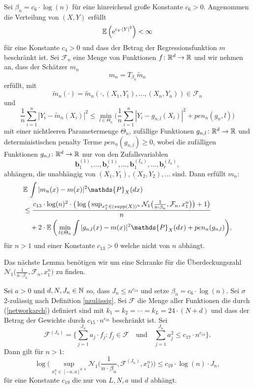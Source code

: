   \begin{lem}
  \label{lem:8}
Sei $\beta_n = c_6 \cdot \log(n)$ für eine hinreichend große Konstante $c_6 > 0$. Angenommen die Verteilung von $(X, Y)$ erfüllt 
$$ \mathbb{E}\,\Big(\mathrm{e}^{c_4 \cdot |Y|^2}\Big) < \infty$$
für eine Konstante $c_4 > 0$ und dass der Betrag der Regressionsfunktion $m$ beschränkt ist. Sei $\mathcal{F}_n$ eine Menge von Funktionen $f\colon \mathbb{R}^d \to \mathbb{R}$ und wir nehmen an, dass der Schätzer $m_n$ 
$$m_n = T_{\beta_n}\tilde{m}_n$$ 
erfüllt, mit 
$$\tilde{m}_n(\cdot) = \tilde{m}_n(\cdot,(X_1, Y_1),\dots,(X_n, Y_n)) \in \mathcal{F}_n$$
und 
$$\frac{1}{n} \sum_{i = 1}^n |Y_i - \tilde{m}_n(X_i)|^2 \leq \min_{l \in \Theta_n}\bigg(\frac{1}{n}\sum_{i = 1}^n |Y_i - g_{n,l}(X_i)|^2 + pen_n(g_n,l)\bigg)$$
mit einer nichtleeren Parametermenge $\Theta_n$, zufällige Funktionen $g_{n,l}\colon \mathbb{R}^d \to \mathbb{R}$ und deterministischen penalty Terme $pen_n(g_{n,l}) \geq 0$, wobei die zufälligen Funktionen $g_{n,l}\colon \mathbb{R}^d \to \mathbb{R}$ nur von den Zufallsvariablen
$$\mathbf{b}_1^{(1)},\dots,\mathbf{b}_r^{(1)},\dots,\mathbf{b}_1^{(I_n)},\dots,\mathbf{b}_r^{(I_n)},$$
abhängen, die unabhängig von $(X_1, Y_1), (X_2, Y_2),\dots$ sind.
Dann erfüllt $m_n\colon$
\begin{equation*}
\begin{split}
& \E \int |m_n(x) - m(x)|^2 \mathds{P}_X(dx) \\
& \leq \frac{c_{13} \cdot \log(n)^2 \cdot \big(\log\big(\sup_{x_1^n \in (supp(X))^n}\mathcal{N}_1\big(\frac{1}{n \cdot \beta_n},\mathcal{F}_n,x_1^n\big)\big) + 1\big)}{n} \\
& \quad + 2 \cdot \E\bigg(\min_{l \in \Theta_n} \int |g_{n,l}(x) - m(x)|^2 \mathds{P}_X(dx) + pen_n(g_{n,l})\bigg),
\end{split}
\end{equation*}
für $n > 1$ und einer Konstante $c_{13} > 0$ welche nicht von $n$ abhängt.
  \end{lem}
Das nächste Lemma benötigen wir um eine Schranke für die Überdeckungszahl $\mathcal{N}_1\big(\frac{1}{n \cdot \beta_n},\mathcal{F}_n,x_1^n\big)$ zu finden.
\begin{lem}
\label{lem:9}
Sei $a > 0$ und $d, N, J_n \in \mathbb{N}$ so, dass $J_n \leq n^{c_{14}}$ und setze $\beta_n = c_6 \cdot \log(n).$
Sei $\sigma$ 2-zulässig nach Definition \ref{nzulässig}. Sei $\mathcal{F}$ die Menge aller Funktionen die durch (\ref{networkarch}) definiert sind mit $k_1 = k_2 = \cdots = k_L = 24 \cdot (N + d)$ und dass der Betrag der Gewichte durch $c_{15} \cdot n^{c_{16}}$ beschränkt ist. Sei
$$ \mathcal{F}^{(J_n)} = \biggl\{\sum_{j = 1}^{J_n} a_j \cdot f_j : f_j \in \mathcal{F} \quad \text{und} \quad \sum_{j = 1}^{J_n} a_j^2 \leq c_{17} \cdot n^{c_{18}}\biggr\}.$$
Dann gilt für $n > 1:$
$$\log\bigg(\sup_{x_1^n\in[-a,a]^{d \cdot n}} \mathcal{N}_1\bigg(\frac{1}{n \cdot \beta_n}, \mathcal{F}^{(J_n)},x_1^n\bigg)\bigg) \leq c_{19} \cdot \log(n) \cdot J_n,$$
für eine Konstante $c_{19}$ die nur von $L, N, a$ und $d$ abhängt.
\end{lem}